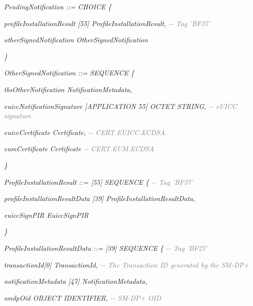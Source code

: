 \documentclass[10pt, oneside]{book}
\begin{document}
\textit{PendingNotification ::= CHOICE \{}

\hspace{0.75cm} \textit{profileInstallationResult [55] ProfileInstallationResult, \textcolor{gray}{{-}{-} Tag 'BF37'}}

\hspace{0.75cm} \textit{otherSignedNotification OtherSignedNotification}

\textit{\}\\}

\textit{OtherSignedNotification ::= SEQUENCE \{}

\hspace{0.75cm} \textit{tbsOtherNotification NotificationMetadata,}

\hspace{0.75cm} \textit{euiccNotificationSignature [APPLICATION 55] OCTET STRING, \textcolor{gray}{{-}{-} eUICC signature}}

\hspace{0.75cm} \textit{euiccCertificate Certificate, \textcolor{gray}{{-}{-} CERT.EUICC.ECDSA}}

\hspace{0.75cm} \textit{eumCertificate Certificate \textcolor{gray}{{-}{-} CERT.EUM.ECDSA}}

\textit{\}\\}

\textit{ProfileInstallationResult ::= [55] SEQUENCE \{ \textcolor{gray}{{-}{-} Tag 'BF37'}}

\hspace{0.75cm} \textit{profileInstallationResultData [39] ProfileInstallationResultData,}

\hspace{0.75cm} \textit{euiccSignPIR EuiccSignPIR}

\textit{\}\\}

\textit{ProfileInstallationResultData ::= [39] SEQUENCE \{ \textcolor{gray}{{-}{-} Tag 'BF27'}}

\hspace{0.75cm} \textit{transactionId[0] TransactionId, \textcolor{gray}{{-}{-} The Transaction ID generated by the SM-DP+}}

\hspace{0.75cm} \textit{notificationMetadata [47] NotificationMetadata,}

\hspace{0.75cm} \textit{smdpOid OBJECT IDENTIFIER, \textcolor{gray}{{-}{-} SM-DP+ OID}}
\end{document}
